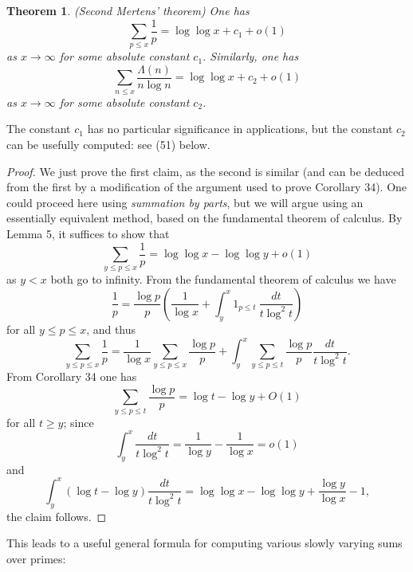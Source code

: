 \documentclass[10pt,reqno]{amsart}
\newtheorem{theorem}{Theorem}
\begin{document}
\begin{theorem} (Second Mertens’ theorem) One has
    \[  \sum_{p \leq x} \frac{1}{p} = \log\log x + c_1 + o(1)\]
    as $x \rightarrow \infty$ for some absolute constant $c_1$. Similarly, one has
    \begin{equation}   \sum_{n \leq x} \frac{\Lambda(n)}{n \log n} = \log\log x + c_2 + o(1) \end{equation}
    as $x \rightarrow \infty$ for some absolute constant $c_2$.
\end{theorem}

The constant $c_1$ has no particular significance in applications, but the constant $c_2$ can be usefully computed: see (51) below.

\begin{proof}
    We just prove the first claim, as the second is similar (and can be deduced from the first by a modification of the argument used to prove Corollary 34). One could proceed here using \emph{summation by parts}, but we will argue using an essentially equivalent method, based on the fundamental theorem of calculus. By Lemma 5, it suffices to show that
    \[  \sum_{y \leq p \leq x} \frac{1}{p} = \log\log x - \log\log y + o(1)\]
    as $y<x$ both go to infinity. From the fundamental theorem of calculus we have
    \[  \frac{1}{p} = \frac{\log p}{p} \left( \frac{1}{\log x} + \int_y^x 1_{p \leq t}\ \frac{dt}{t \log^2 t} \right) \]
    for all $y \leq p \leq x$, and thus
    \[  \sum_{y \leq p \leq x} \frac{1}{p} = \frac{1}{\log x} \sum_{y \leq p \leq x} \frac{\log p}{p} + \int_y^x \sum_{y \leq p \leq t} \frac{\log p}{p} \frac{dt}{t \log^2 t}.\]
    From Corollary 34 one has
    \[  \sum_{y \leq p \leq t} \frac{\log p}{p} = \log t - \log y + O(1)\]
    for all $t \geq y$; since
    \[ \int_y^x \frac{dt}{t \log^2 t} = \frac{1}{\log y} - \frac{1}{\log x} = o(1)\]
    and
    \[ \int_y^x (\log t - \log y) \frac{dt}{t \log^2 t} = \log\log x - \log\log y + \frac{\log y}{\log x} - 1,\]
    the claim follows. %
\end{proof}

This leads to a useful general formula for computing various slowly varying sums over primes:
\end{document}
